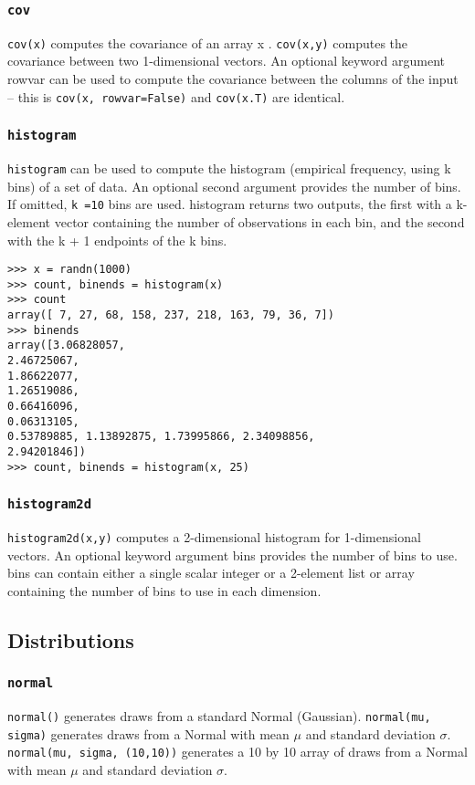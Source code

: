 \documentclass[KSmain.tex]{subfiles}
\begin{document}
\subsubsection*{\texttt{cov}}
\texttt{cov(x)} computes the covariance of an array x . \texttt{cov(x,y)} computes the covariance between two 1-dimensional
vectors. An optional keyword argument rowvar can be used to compute the covariance between the
columns of the input – this is \texttt{cov(x, rowvar=False)} and \texttt{cov(x.T)} are identical.
\subsubsection*{\texttt{histogram}}
\texttt{histogram} can be used to compute the histogram (empirical frequency, using k bins) of a set of data. An
optional second argument provides the number of bins. If omitted, \texttt{k =10} bins are used. histogram returns
two outputs, the first with a k-element vector containing the number of observations in each bin, and the
second with the k + 1 endpoints of the k bins.
\begin{framed}
\begin{verbatim}
>>> x = randn(1000)
>>> count, binends = histogram(x)
>>> count
array([ 7, 27, 68, 158, 237, 218, 163, 79, 36, 7])
>>> binends
array([3.06828057,
2.46725067,
1.86622077,
1.26519086,
0.66416096,
0.06313105,
0.53789885, 1.13892875, 1.73995866, 2.34098856,
2.94201846])
>>> count, binends = histogram(x, 25)
\end{verbatim}
\end{framed}
\subsubsection*{\texttt{histogram2d}}
\texttt{histogram2d(x,y)} computes a 2-dimensional histogram for 1-dimensional vectors. An optional keyword
argument bins provides the number of bins to use. bins can contain either a single scalar integer or a
2-element list or array containing the number of bins to use in each dimension.
\newpage
\subsection{Distributions}
\subsubsection{\texttt{normal}}
\texttt{normal()} generates draws from a standard Normal (Gaussian). \texttt{normal(mu, sigma)} generates draws from
a Normal with mean $\mu$ and standard deviation $\sigma$. \texttt{normal(mu, sigma, (10,10))} generates a 10 by 10 array
of draws from a Normal with mean $\mu$ and standard deviation $\sigma$. 
\end{document}
